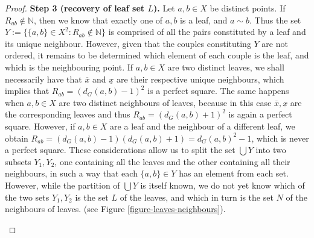 \documentclass[a4paper,11pt,oneside]{amsart}
\newcommand{\N}{{\mathbb N}}
\begin{document}
\begin{proof}
\textbf{Step 3 (recovery of leaf set $L$).} Let $a,b\in X$ be distinct points. If $R_{ab}\notin\N$, then we know that exactly one of $a,b$ is a leaf, and $a\sim b$.
Thus the set $Y:=\{ \{a,b\} \in X^2 : R_{ab}\notin\N\}$ is comprised of all the pairs constituted by a leaf and its unique neighbour. However, given that the couples constituting $Y$ are not ordered, it remains to be determined which element of each couple is the leaf, and which is the neighbouring point. If $a,b\in X$ are two distinct leaves, we shall necessarily have that $\overline x$ and $\underline x$ are their respective unique neighbours, which implies that $R_{ab} = (d_G(a,b)-1)^2$ is a perfect square. The same happens when $a,b\in X$ are two distinct neighbours of leaves, because in this case $\overline x, \underline x$ are the corresponding leaves and thus $R_{ab}=(d_G(a,b)+1)^2$ is again a perfect square. However, if $a,b\in X$ are a leaf and the neighbour of a different leaf, we obtain $R_{ab} = (d_G(a,b)-1)(d_G(a,b)+1)= d_G(a,b)^2-1$, which is never a perfect square. These considerations allow us to split the set $\bigcup Y$ into two subsets $Y_1, Y_2$, one containing all the leaves and the other containing all their neighbours, in such a way that each $\{a,b\}\in Y$ has an element from each set. However, while the partition of $\bigcup Y$ is itself known, we do not yet know which of the two sets $Y_1, Y_2$ is the set $L$ of the leaves, and which in turn is the set $N$ of the neighbours of leaves. (see Figure \ref{figure-leaves-neighbours}). 

\begin{figure}[!h]
\centering
{}
\end{figure}
\end{proof}
\end{document}
